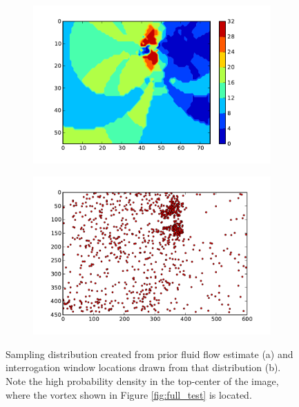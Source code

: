 \documentclass{article}
\begin{document}
\begin{figure}
	\centering
	\begin{subfigure}[htb]{0.45\textwidth}
		\centering
		\includegraphics[width=\textwidth]{fig/sample_density.pdf}
	\end{subfigure}
	\begin{subfigure}[htb]{0.45\textwidth}
		\centering
		\includegraphics[width=\textwidth]{fig/sample_points.pdf}
	\end{subfigure}
	\caption{Sampling distribution created from prior fluid flow estimate (a) and interrogation window locations drawn from that distribution (b). Note the high probability density in the top-center of the image, where the vortex shown in Figure \ref{fig:full_test} is located.}
	\label{fig:distribution}
\end{figure}
\end{document}
